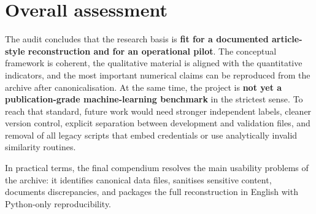 \documentclass[11pt,a4paper]{article}
\begin{document}
\section{Overall assessment}
The audit concludes that the research basis is \textbf{fit for a documented article-style reconstruction and for an operational pilot}. The conceptual framework is coherent, the qualitative material is aligned with the quantitative indicators, and the most important numerical claims can be reproduced from the archive after canonicalisation. At the same time, the project is \textbf{not yet a publication-grade machine-learning benchmark} in the strictest sense. To reach that standard, future work would need stronger independent labels, cleaner version control, explicit separation between development and validation files, and removal of all legacy scripts that embed credentials or use analytically invalid similarity routines.

In practical terms, the final compendium resolves the main usability problems of the archive: it identifies canonical data files, sanitises sensitive content, documents discrepancies, and packages the full reconstruction in English with Python-only reproducibility.
\end{document}
